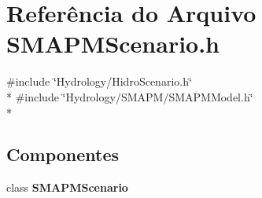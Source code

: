 \section{Referência do Arquivo S\+M\+A\+P\+M\+Scenario.\+h}
\label{_s_m_a_p_m_scenario_8h}
{\ttfamily \#include \char`\"{}Hydrology/\+Hidro\+Scenario.\+h\char`\"{}}\\*
{\ttfamily \#include \char`\"{}Hydrology/\+S\+M\+A\+P\+M/\+S\+M\+A\+P\+M\+Model.\+h\char`\"{}}\\*
\subsection*{Componentes}
\begin{DoxyCompactItemize}
\item 
class {\bf S\+M\+A\+P\+M\+Scenario}
\end{DoxyCompactItemize}
